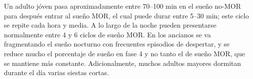 



Un adulto j\'oven pasa aproximadamente entre 70--100 min en el sue\~no no-MOR para despu\'es entrar 
al sue\~no MOR, el cual puede durar entre 5--30 min; este ciclo se repite cada hora y media.
A lo largo de la noche pueden presentarse normalmente entre 4 y 6 ciclos de 
sue\~no MOR.
En los ancianos se va fragmentando el sue\~no nocturno con frecuentes episodios de despertar, y se 
reduce mucho el porcentaje de sue\~no en fase 4 y no tanto el de sue\~no MOR, que se mantiene 
m\'as constante.%
Adicionalmente, muchos adultos mayores dormitan
durante el d\'ia varias siestas cortas\cite{CarrilloMora}.

